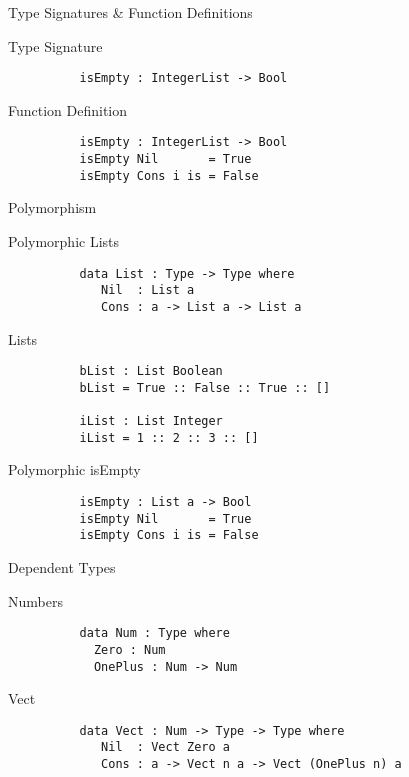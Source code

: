 \documentclass[presentation]{beamer}
\begin{document}
\begin{frame}[fragile]{Type Signatures \& Function Definitions}
      \begin{block}{Type Signature}
        \begin{verbatim}
          isEmpty : IntegerList -> Bool
        \end{verbatim}
      \end{block}
      \begin{block}{Function Definition}
        \begin{verbatim}
          isEmpty : IntegerList -> Bool
          isEmpty Nil       = True
          isEmpty Cons i is = False
        \end{verbatim}
      \end{block}
\end{frame}

\begin{frame}[fragile]{Polymorphism}
      \begin{block}{Polymorphic Lists}
        \begin{verbatim}
          data List : Type -> Type where
             Nil  : List a
             Cons : a -> List a -> List a
        \end{verbatim}
      \end{block}
      \begin{block}{Lists}
        \begin{verbatim}
          bList : List Boolean
          bList = True :: False :: True :: []

          iList : List Integer
          iList = 1 :: 2 :: 3 :: []
        \end{verbatim}
      \end{block}

      \begin{block}{Polymorphic isEmpty}
        \begin{verbatim}
          isEmpty : List a -> Bool
          isEmpty Nil       = True
          isEmpty Cons i is = False
        \end{verbatim}
      \end{block}
\end{frame}

\begin{frame}[fragile]{Dependent Types}
      \begin{block}{Numbers}
        \begin{verbatim}
          data Num : Type where
            Zero : Num
            OnePlus : Num -> Num 
        \end{verbatim}
      \end{block}
      \begin{block}{Vect}
        \begin{verbatim}
          data Vect : Num -> Type -> Type where
             Nil  : Vect Zero a
             Cons : a -> Vect n a -> Vect (OnePlus n) a
        \end{verbatim}
      \end{block}
\end{frame}
\end{document}
